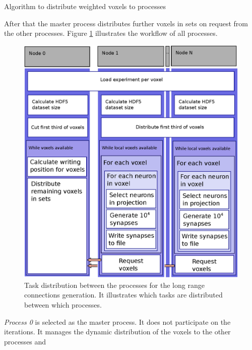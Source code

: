 \begin{algorithm}[ht!]
\caption{Algorithm to distribute weighted voxels to processes}
\label{alg:distributeWeightedVoxels}
\end{algorithm}
After that the master process distributes further voxels in sets on request from the other processes.
Figure \ref{fig:longrangParallel} illustrates the workflow of all processes.
\begin{figure}[ht!]
\centering
\includegraphics[scale=0.5]{pictures/longRange_parallelAlg.eps}
\caption{Task distribution between the processes for the long range connections generation. It illustrates which tasks are distributed between which processes.}
\label{fig:longrangParallel}
\end{figure}
\emph{Process 0} is selected as the master process. It does not participate on the iterations.
It manages the dynamic distribution of the voxels to the other processes and 
